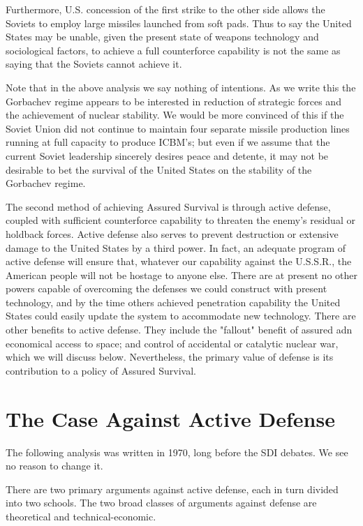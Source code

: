 Furthermore, U.S. concession of the first strike to the other side allows the Soviets to employ large missiles launched from soft pads. Thus to say the United States may be unable, given the present state of weapons technology and sociological factors, to achieve a full counterforce capability is not the same as saying that the Soviets cannot achieve it.

Note that in the above analysis we say nothing of intentions. As we write this the Gorbachev regime appears to be interested in reduction of strategic forces and the achievement of nuclear stability. We would be more convinced of this if the Soviet Union did not continue to maintain four separate missile production lines running at full capacity to produce ICBM's; but even if we assume that the current Soviet leadership sincerely desires peace and detente, it may not be desirable to bet the survival of the United States on the stability of the Gorbachev regime.

The second method of achieving Assured Survival is through active defense, coupled with sufficient counterforce capability to threaten the enemy's residual or holdback forces. Active defense also serves to prevent destruction or extensive damage to the United States by a third power. In fact, an adequate program of active defense will ensure that, whatever our capability against the U.S.S.R., the American people will not be hostage to anyone else. There are at present no other powers capable of overcoming the defenses we could construct with present technology, and by the time others achieved penetration capability the United States could easily update the system to accommodate new technology. There are other benefits to active defense. They include the "fallout" benefit of assured adn economical access to space; and control of accidental or catalytic nuclear war, which we will discuss below. Nevertheless, the primary value of defense is its contribution to a policy of Assured Survival.

\section{The Case Against Active Defense}
\begin{mdframed}[backgroundcolor=black!10]
The following analysis was written in 1970, long before the SDI debates. We see no reason to change it.
\end{mdframed}

There are two primary arguments against active defense, each in turn divided into two schools. The two broad classes of arguments against defense are theoretical and technical-economic.

